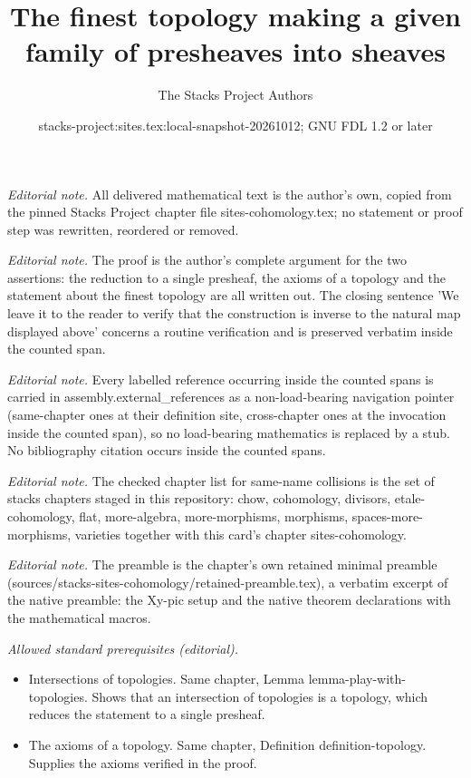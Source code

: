 \documentclass[10pt,a4paper]{amsart}
\title{The finest topology making a given family of presheaves into sheaves}
\author{The Stacks Project Authors}
\date{stacks-project:sites.tex:local-snapshot-20261012; GNU FDL 1.2 or later}
\theoremstyle{plain}
\theoremstyle{definition}
\theoremstyle{remark}
\numberwithin{equation}{subsection}
\begin{document}
\maketitle
\noindent\textit{Editorial note.} All delivered mathematical text is the author's own, copied from the pinned Stacks Project chapter file sites-cohomology.tex; no statement or proof step was rewritten, reordered or removed.\par\medskip
\noindent\textit{Editorial note.} The proof is the author's complete argument for the two assertions: the reduction to a single presheaf, the axioms of a topology and the statement about the finest topology are all written out. The closing sentence 'We leave it to the reader to verify that the construction is inverse to the natural map displayed above' concerns a routine verification and is preserved verbatim inside the counted span.\par\medskip
\noindent\textit{Editorial note.} Every labelled reference occurring inside the counted spans is carried in assembly.external\_references as a non-load-bearing navigation pointer (same-chapter ones at their definition site, cross-chapter ones at the invocation inside the counted span), so no load-bearing mathematics is replaced by a stub. No bibliography citation occurs inside the counted spans.\par\medskip
\noindent\textit{Editorial note.} The checked chapter list for same-name collisions is the set of stacks chapters staged in this repository: chow, cohomology, divisors, etale-cohomology, flat, more-algebra, more-morphisms, morphisms, spaces-more-morphisms, varieties together with this card's chapter sites-cohomology.\par\medskip
\noindent\textit{Editorial note.} The preamble is the chapter's own retained minimal preamble (sources/stacks-sites-cohomology/retained-preamble.tex), a verbatim excerpt of the native preamble: the Xy-pic setup and the native theorem declarations with the mathematical macros.\par\medskip
\noindent\textit{Allowed standard prerequisites (editorial).}\begin{itemize}
\item Intersections of topologies. Same chapter, Lemma lemma-play-with-topologies. Shows that an intersection of topologies is a topology, which reduces the statement to a single presheaf.
\item The axioms of a topology. Same chapter, Definition definition-topology. Supplies the axioms verified in the proof.
\end{itemize}\medskip
\end{document}
